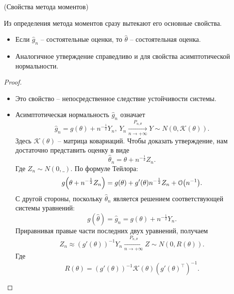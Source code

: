 \begin{theorem}(Свойства метода моментов)

    Из определения метода моментов сразу вытекают его основные свойства.
    \begin{itemize}
        \item Если $\hat{g}_n$ -- состоятельные оценки, то $\hat{\theta}$
            -- состоятельная оценка.
        \item Аналогичное утверждение справедливо и для свойства
            асимптотической нормальности.
    \end{itemize}
\end{theorem}
\begin{proof}
    \enewline
    \begin{itemize}
        \item Это свойство -- непосредственное следствие устойчивости системы.
        \item Асимптотическая нормальность $\hat{g}_n$ означает
            \[
                \hat{g}_n = g(\theta) + n^{-\frac{1}{2}} Y_n,~
                Y_n \xrightarrow[n \to +\infty]{P_{n, \theta}} Y \sim
                N(0, \mathcal{K}(\theta))
            .\]
            Здесь $\mathcal{K}(\theta)$ -- матрица ковариаций. Чтобы доказать
            утверждение, нам достаточно представить оценку в виде
            \[
                \hat{\theta}_n = \theta + n^{-\frac{1}{2}} Z_n
            .\]
            Где $Z_n \sim N(0, \_)$. По формуле Тейлора:
            \[
                g\parens*{\theta + n^{-\frac{1}{2}} Z_n} = 
                g(\theta) + g'(\theta) n^{-\frac{1}{2}} Z_n + \cO\parens*{n^{-1}}
            .\]
            С другой стороны, поскольку $\hat{\theta}_n$ является решением
            соответствующей системы уравнений:
            \[
                g(\hat{\theta}) = \hat{g}_n = g(\theta) + n^{-\frac{1}{2}} Y_n
            .\]
            Приравнивая правые части последних двух уравнений, получаем
            \[
                Z_n \approx (g'(\theta))^{-1} Y_n \xrightarrow[n \to +\infty]
                {P_{n, \theta}} Z \sim N(0, R(\theta))
            .\]
            Где
            \[
                R(\theta) = (g'(\theta))^{-1} \mathcal{K}(\theta) 
                (g'(\theta)^\top)^{-1}
            .\]
    \end{itemize}
\end{proof}


